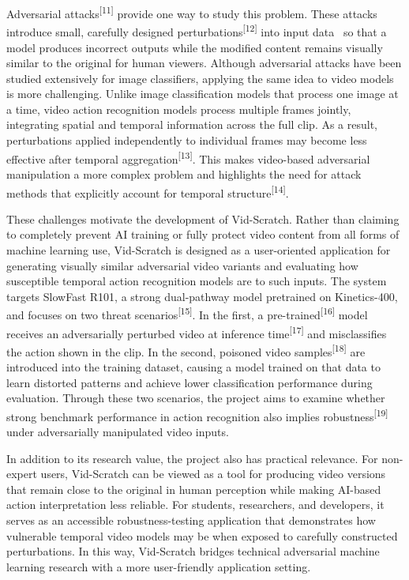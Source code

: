 Adversarial attacks\textsuperscript{[11]} provide one way to study this problem. These attacks introduce small, carefully designed perturbations\textsuperscript{[12]} into input data~\cite{goodfellow2015explaining} so that a model produces incorrect outputs while the modified content remains visually similar to the original for human viewers. Although adversarial attacks have been studied extensively for image classifiers, applying the same idea to video models is more challenging. Unlike image classification models that process one image at a time, video action recognition models process multiple frames jointly, integrating spatial and temporal information across the full clip. As a result, perturbations applied independently to individual frames may become less effective after temporal aggregation\textsuperscript{[13]}. This makes video-based adversarial manipulation a more complex problem and highlights the need for attack methods that explicitly account for temporal structure\textsuperscript{[14]}.

These challenges motivate the development of Vid-Scratch. Rather than claiming to completely prevent AI training or fully protect video content from all forms of machine learning use, Vid-Scratch is designed as a user-oriented application for generating visually similar adversarial video variants and evaluating how susceptible temporal action recognition models are to such inputs. The system targets SlowFast R101, a strong dual-pathway model pretrained on Kinetics-400, and focuses on two threat scenarios\textsuperscript{[15]}. In the first, a pre-trained\textsuperscript{[16]} model receives an adversarially perturbed video at inference time\textsuperscript{[17]} and misclassifies the action shown in the clip. In the second, poisoned video samples\textsuperscript{[18]} are introduced into the training dataset, causing a model trained on that data to learn distorted patterns and achieve lower classification performance during evaluation. Through these two scenarios, the project aims to examine whether strong benchmark performance in action recognition also implies robustness\textsuperscript{[19]} under adversarially manipulated video inputs.

In addition to its research value, the project also has practical relevance. For non-expert users, Vid-Scratch can be viewed as a tool for producing video versions that remain close to the original in human perception while making AI-based action interpretation less reliable. For students, researchers, and developers, it serves as an accessible robustness-testing application that demonstrates how vulnerable temporal video models may be when exposed to carefully constructed perturbations. In this way, Vid-Scratch bridges technical adversarial machine learning research with a more user-friendly application setting.

